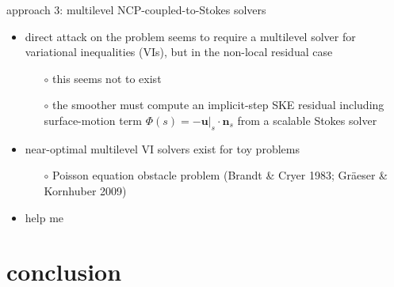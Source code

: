 \documentclass[svgnames,
               hyperref={colorlinks,citecolor=DeepPink4,linkcolor=FireBrick,urlcolor=Maroon},
               usepdftitle=false]  %
               {beamer}
\newcommand{\bn}{\mathbf{n}}
\newcommand{\bu}{\mathbf{u}}
\begin{document}
\begin{frame}{approach 3: multilevel NCP-coupled-to-Stokes solvers}

\begin{itemize}
\item direct attack on the problem seems to require a \alert{multilevel} solver for \alert{variational inequalities} (VIs), but in the \alert{non-local residual case}
    \begin{itemize}
    \item[$\circ$] this seems not to exist
    \item[$\circ$] the \alert{smoother} must compute an implicit-step SKE residual including surface-motion term $\Phi(s) = - \bu|_s\cdot \bn_s$ from a scalable Stokes solver
    \end{itemize}
\item near-optimal multilevel VI solvers exist for toy problems
    \begin{itemize}
    \item[$\circ$] Poisson equation obstacle problem (Brandt \& Cryer 1983; Gr\"aeser \& Kornhuber 2009)
    \end{itemize}
\item<2> \alert{help me}
\end{itemize}
\end{frame}


\section{conclusion}
\end{document}
